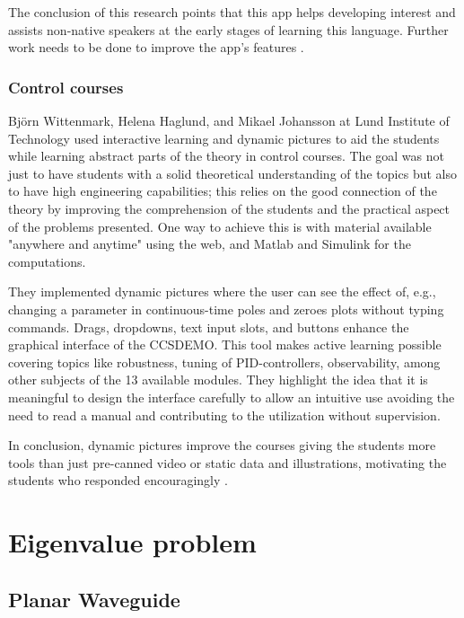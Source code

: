 The conclusion of this research points that this app helps developing interest and assists non-native speakers at the early stages of learning this language. Further work needs to be done to improve the app's features \cite{CHACHIL2015267}. 



\subsubsection{Control courses}
Björn Wittenmark, Helena Haglund, and Mikael Johansson at Lund Institute of Technology used interactive learning and dynamic pictures to aid the students while learning abstract parts of the theory in control courses. The goal was not just to have students with a solid theoretical understanding of the topics but also to have high engineering capabilities; this relies on the good connection of the theory by improving the comprehension of the students and the practical aspect of the problems presented. One way to achieve this is with material available "anywhere and anytime" using the web, and Matlab and Simulink for the computations. 

They implemented dynamic pictures where the user can see the effect of, e.g., changing a parameter in continuous-time poles and zeroes plots without typing commands. Drags, dropdowns, text input slots, and buttons enhance the graphical interface of the CCSDEMO. This tool makes active learning possible covering topics like robustness, tuning of PID-controllers, observability, among other subjects of the 13 available modules. They highlight the idea that it is meaningful to design the interface carefully to allow an intuitive use avoiding the need to read a manual and contributing to the utilization without supervision.

In conclusion, dynamic pictures improve the courses giving the students more tools than just pre-canned video or static data and illustrations, motivating the students who responded encouragingly \cite{IEEEcontrol}.




\section{Eigenvalue problem}

    \subsection{Planar Waveguide}
        
